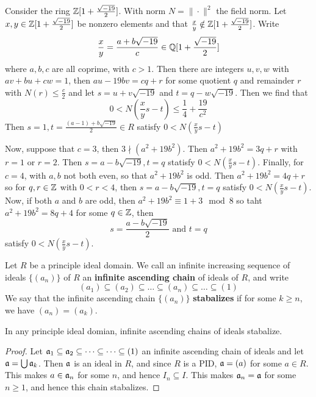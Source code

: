 \begin{example}\label{example_6.5}
  Consider the ring $\mathbb{Z}[1+\frac{\sqrt{-19}}{2}]$. With norm  $N=\|\cdot\|^2$
  the field norm. Let $x,y \in \mathbb{Z}[1+\frac{\sqrt{-19}}{2}]$ be nonzero elements
  and that $\frac{x}{y} \notin \mathbb{Z}[1+\frac{\sqrt{-19}}{2}]$. Write
  \begin{equation*}
    \frac{x}{y}=\frac{a+b\sqrt{-19}}{c} \in \mathbb{Q}[1+\frac{\sqrt{-19}}{2}]
  \end{equation*}
  where $a,b,c$ are all coprime, with  $c>1$. Then there are integers $u,v,w$
  with $av+bu+cw=1$, then  $au-19bv=cq+r$ for some quotient $q$ and remainder
  $r$ with  $N(r) \leq \frac{c}{2}$ and let $s=u+v\sqrt{-19}$ and
  $t=q-w\sqrt{-19}$. Then we find that
  \begin{equation*}
    0<N(\frac{x}{y}s-t) \leq \frac{1}{4}+\frac{19}{c^2}
  \end{equation*}
  Then $s=1, t=\frac{(a-1)+b\sqrt{-19}}{2} \in R$ satisfy $0<N(\frac{x}{y}s-t)$

  Now, suppose that $c=3$, then $3 \nmid (a^2+19b^2)$. Then $a^2+19b^2=3q+r$
  with  $r=1$ or $r=2$. Then $s=a-b\sqrt{-19},t=q$ statisfy
  $0<N(\frac{x}{y}s-t)$. Finally, for $c=4$, with $a,b$ not both even, so
  that $a^2+19b^2$ is odd. Then $a^2+19b^2=4q+r$ so for $q,r \in \mathbb{Z}$ with
  $0<r<4$, then $s=a-b\sqrt{-19}, t=q$ satisfy $0<N(\frac{x}{y}s-t)$. Now, if
  both $a$ and  $b$ are odd, then  $a^2+19b^2 \equiv 1+3 \mod{8}$ so taht
  $a^2+19b^2=8q+4$ for some  $q \in \mathbb{Z}$, then
  \begin{equation*}
    s=\frac{a-b\sqrt{-19}}{2} \text{ and } t=q
  \end{equation*}
  satisfy $0<N(\frac{x}{y}s-t)$.
\end{example}


\begin{definition}
  Let $R$ be a principle ideal domain. We call an infinite increasing sequence
  of ideals $\{(a_n)\}$ of $R$ an \textbf{infinite ascending chain} of
  ideals of $R$, and write
  \begin{equation*}
    (a_1) \subseteq (a_2) \subseteq \dots \subseteq (a_n) \subseteq \dots \subseteq (1)
  \end{equation*}
  We say that the infinite ascending chain $\{(a_n)\}$ \textbf{stabalizes} if
  for some $k \geq n$, we have  $(a_n)=(a_k)$.
\end{definition}

\begin{lemma}\label{lemma_6.2.4}
  In any principle ideal domian, infinite ascending chains of ideals
  stabalize.
\end{lemma}
\begin{proof}
  Let $\mathfrak{a}_1 \subseteq \mathfrak{a}_2 \subseteq \dots \subseteq \dots \subseteq
  (1)$ an infinite ascending chain of ideals and let $\mathfrak{a}=\bigcup{\mathfrak{a}_k}$. Then
  $\mathfrak{a}$ is an ideal in  $R$, and since  $R$ is a PID,  $\mathfrak{a}=(a)$ for some $a \in R$.
  This makes  $a \in \mathfrak{a}_n$ for some  $n$, and hence  $I_n \subseteq I$. This makes
  $\mathfrak{a}_n=\mathfrak{a}$ for some $n \geq 1$, and hence this chain stabalizes.
\end{proof}

